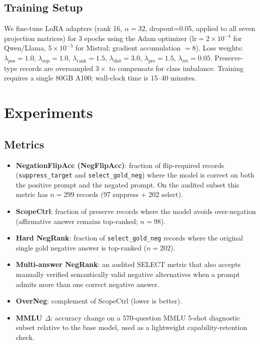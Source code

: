 \documentclass[letterpaper]{article}
\begin{document}
\subsection{Training Setup}

We fine-tune LoRA adapters (rank 16, $\alpha=32$, dropout=0.05,
applied to all seven projection matrices) for 3 epochs using the Adam
optimizer ($\mathrm{lr}=2\times10^{-4}$ for Qwen/Llama,
$5\times10^{-5}$ for Mistral; gradient accumulation $=8$).
Loss weights: $\lambda_\text{pos}=1.0$, $\lambda_\text{sup}=1.0$,
$\lambda_\text{rank}=1.5$, $\lambda_\text{dist}=3.0$,
$\lambda_\text{pre}=1.5$, $\lambda_\text{ret}=0.05$.
Preserve-type records are oversampled $3\times$ to compensate
for class imbalance.
Training requires a single 80GB A100; wall-clock time is 15--40 minutes.

\section{Experiments}
\label{sec:experiments}

\subsection{Metrics}
\label{sec:metrics}

\begin{itemize}
\item \textbf{NegationFlipAcc (NegFlipAcc)}: fraction of flip-required records
  (\texttt{suppress\_target} and \texttt{select\_gold\_neg}) where the model is
  correct on both the positive prompt and the negated prompt. On the audited
  subset this metric has $n{=}299$ records (97 suppress + 202 select).
\item \textbf{ScopeCtrl}: fraction of preserve records where the model
  avoids over-negation (affirmative answer remains top-ranked; $n{=}98$).
\item \textbf{Hard NegRank}: fraction of \texttt{select\_gold\_neg} records
  where the original single gold negative answer is top-ranked ($n{=}202$).
\item \textbf{Multi-answer NegRank}: an audited SELECT metric that also accepts
  manually verified semantically valid negative alternatives when a prompt
  admits more than one correct negative answer.
\item \textbf{OverNeg}: complement of ScopeCtrl (lower is better).
\item \textbf{MMLU $\Delta$}: accuracy change on a 570-question MMLU 5-shot
  diagnostic subset relative to the base model, used as a lightweight
  capability-retention check.
\end{itemize}
\end{document}
